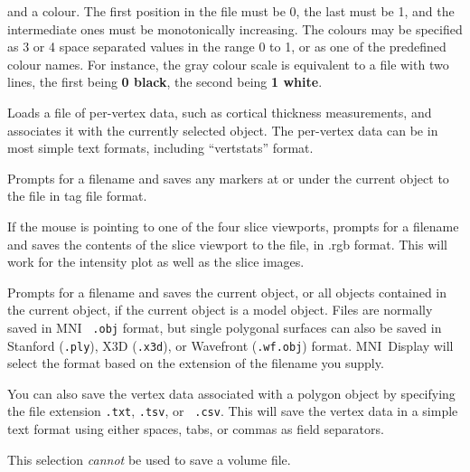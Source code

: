 \documentclass[11pt,letterpaper]{article}
\newcommand{\display}{\mbox{MNI Display}}
\newcommand{\menutwo}[2]{{\scriptsize \fbox{\bf #1}/\fbox{\bf #2}}}
\begin{document}
\begin{description}
  and a colour.  The first position in the file must be 0, the last
  must be 1, and the intermediate ones must be monotonically increasing.
  The colours may be specified as 3 or 4 space separated values in the
  range 0 to 1, or as one of the predefined colour names.  For instance,
  the gray colour scale is equivalent to a file with two lines, the
  first being {\bf 0  black}, the second being {\bf 1 white}.
\item[\menutwo{File}{Load Vertex Data}] Loads a file of per-vertex
  data, such as cortical thickness measurements, and associates it
  with the currently selected object. The per-vertex data can be in
  most simple text formats, including ``vertstats'' format.
\item[\menutwo{File}{Save Mrkrs as .tag}]  Prompts for a filename and
  saves any markers at or under the current object to the file
  in tag file format.
\item[\menutwo{File}{Save Slice Image}]  If the mouse is pointing to one
  of the four slice viewports, prompts for a filename and saves the
  contents of the slice viewport to the file, in .rgb format. This will
  work for the intensity plot as well as the slice images.

\item[\menutwo{File}{Save File}]  Prompts for a filename and saves
 the current object, or all objects contained in the current object, if the
 current object is a model object. Files are normally saved in MNI {\tt
   .obj}
 format, but single polygonal surfaces can also be saved in Stanford
 ({\tt .ply}), X3D ({\tt .x3d}), or Wavefront ({\tt .wf.obj}) format. \display{} will select
 the format based on the extension of the filename you supply.

You can also save the vertex data associated with a polygon object by
specifying the file extension {\tt .txt}, {\tt .tsv}, or {\tt
  .csv}. This will save the vertex data in a simple text format using either
spaces, tabs, or commas as field separators.
 
This selection {\em cannot} be used to save a volume file.


\end{description}
\end{document}
